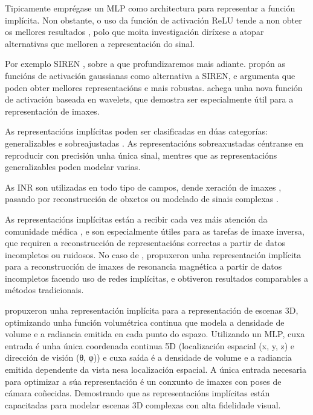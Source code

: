 Tipicamente emprégase un MLP como architectura para representar a función implícita. Non obstante, o uso da función de activación ReLU tende a non obter os mellores resultados \cite{rahaman2019spectralbiasneuralnetworks},
polo que moita investigación diríxese a atopar alternativas que melloren a representación do sinal. \cite{essakine2024standimplicitneuralrepresentations}

Por exemplo SIREN \cite{sitzmann2020implicitneuralrepresentationsperiodic}, sobre a que profundizaremos mais adiante.
\cite{ramasinghe2022periodicityunifyingframeworkactivations} propón as funcións de activación gaussianas como alternativa a SIREN, e argumenta que poden obter mellores representacións e mais robustas.
\cite{saragadam2023wirewaveletimplicitneural} achega unha nova función de activación baseada en wavelets, que demostra ser especialmente útil para a representación de imaxes.

As representacións implícitas poden ser clasificadas en dúas categorías: generalizables e sobreajustadas \cite{yu2024neuraltrajectorymodelimplicit}. 
As representacións sobreaxustadas céntranse en reproducir con precisión unha única sinal, mentres que as representacións generalizables poden modelar varias.

As INR son utilizadas en todo tipo de campos, dende xeración de imaxes \cite{reddy2022multiimplicitneuralrepresentationfonts}, pasando por
reconstrucción de obxetos \cite{mildenhall2020nerfrepresentingscenesneural} \cite{mescheder2019occupancynetworkslearning3d} ou modelado de sinais complexas \cite{wu2021iremhighresolutionmagneticresonance}.

As representacións implícitas están a recibir cada vez máis atención da comunidade médica \cite{molaei2023implicitneuralrepresentationmedical}, e son 
especialmente útiles para as tarefas de imaxe inversa, que requiren a reconstrucción de representacións correctas a partir de datos incompletos ou ruidosos. 
No caso de \cite{shen2023nerpimplicitneuralrepresentation}, propuxeron unha representación implícita para a reconstrucción de imaxes de resonancia magnética a partir de datos incompletos facendo uso de redes implícitas, 
e obtiveron resultados comparables a métodos tradicionais.

\cite{mildenhall2020nerfrepresentingscenesneural} propuxeron unha representación implícita para a representación de escenas 3D, 
 optimizando unha función volumétrica continua que modela a densidade de volume e a radiancia emitida en cada punto do espazo.
 Utilizando un MLP, cuxa entrada é unha única coordenada continua 5D (localización espacial (x, y, z) e dirección de visión (θ, φ)) 
 e cuxa saída é a densidade de volume e a radiancia emitida dependente da vista nesa localización espacial. 
A única entrada necesaria para optimizar a súa representación é un conxunto de imaxes con poses de cámara coñecidas. 
Demostrando que as representacións implícitas están capacitadas para modelar escenas 3D complexas con alta fidelidade visual.
 
